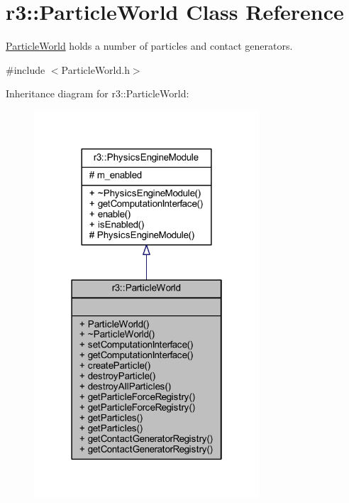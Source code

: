 \hypertarget{classr3_1_1_particle_world}{}\section{r3\+:\+:Particle\+World Class Reference}
\label{classr3_1_1_particle_world}


\mbox{\hyperlink{classr3_1_1_particle_world}{Particle\+World}} holds a number of particles and contact generators.  




{\ttfamily \#include $<$Particle\+World.\+h$>$}



Inheritance diagram for r3\+:\+:Particle\+World\+:\nopagebreak
\begin{figure}[H]
\begin{center}
\leavevmode
\includegraphics[width=238pt]{classr3_1_1_particle_world__inherit__graph}
\end{center}
\end{figure}


